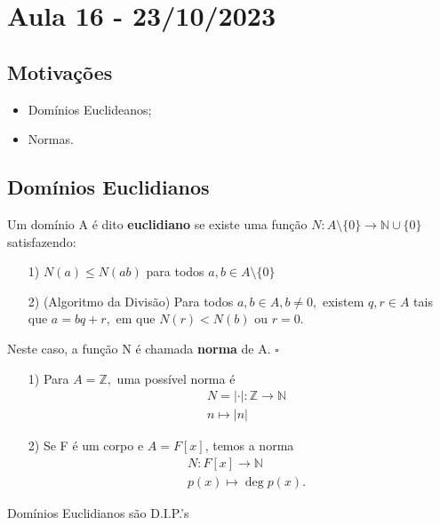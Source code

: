 \documentclass[AlgebraII/algebraII_notes.tex]{subfiles}
\begin{document}
\section{Aula 16 - 23/10/2023}
\subsection{Motivações}
\begin{itemize}
	\item Domínios Euclideanos;
	\item Normas.
\end{itemize}
\subsection{Domínios Euclidianos}
\begin{def*}
	Um domínio A é dito \textbf{euclidiano} se existe uma função \(N:A\setminus{\{0\}}\rightarrow \mathbb{N}\cup\{0\}\)
	satisfazendo:
	\begin{itemize}
		\item[1)] \(N(a)\leq N(ab)\) para todos \(a, b\in A\setminus{\{0\}}\)
		\item[2)] (Algoritmo da Divisão) Para todos \(a, b\in A, b\neq0,\) existem \(q,r\in A\) tais que
		      \(a = bq + r,\) em que \(N(r) < N(b)\) ou \(r = 0\).
	\end{itemize}
	Neste caso, a função N é  chamada \textbf{norma} de A. \(\square\)
\end{def*}
\begin{example}
	\begin{itemize}
		\item[1)] Para \(A = \mathbb{Z},\) uma possível norma é
		      \begin{align*}
			       & N=|\cdot |:\mathbb{Z}\rightarrow \mathbb{N} \\
			       & n\mapsto |n|
		      \end{align*}
		\item[2)] Se F é um corpo e \(A = F[x]\), temos a norma
		      \begin{align*}
			       & N:F[x]\rightarrow \mathbb{N} \\
			       & p(x)\mapsto \deg{p(x)}.
		      \end{align*}
	\end{itemize}
\end{example}
\begin{theorem*}
	Domínios Euclidianos são D.I.P.'s
\end{theorem*}
\end{document}
